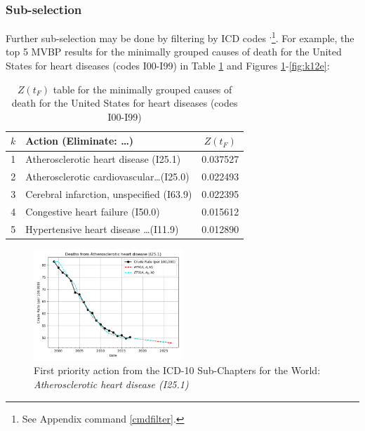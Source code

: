 \documentclass[10pt, a4paper, twocolumn]{IEEEconf}
\newcommand\footnotesstartsep{\textsuperscript{,}}
\begin{document}
\clearpage

\subsubsection{Sub-selection}

Further sub-selection may be done by filtering by ICD codes \citep{icd10vol1}\footnotesstartsep\footnote{See Appendix command \ref{cmdfilter}.}. For example, the top 5 MVBP results for the minimally grouped causes of death for the United States for heart diseases (codes I00-I99) in Table \ref{table:ztable12} and Figures \ref{fig:k12a}-\ref{fig:k12e}:

\begin{table}[H]
  \centering
  \begin{tabular}{clc}
    \toprule
      $k$ & Action (Eliminate: \ldots) & $Z(t_F)$ \\
    \midrule
      1 &        Atherosclerotic heart disease (I25.1) & 0.037527 \\
      2 & Atherosclerotic cardiovascular\ldots (I25.0) & 0.022493 \\
      3 &     Cerebral infarction, unspecified (I63.9) & 0.022395 \\
      4 &             Congestive heart failure (I50.0) & 0.015612 \\
      5 &    Hypertensive heart disease \ldots (I11.9) & 0.012890 \\
    \bottomrule
  \end{tabular}
  \caption{$Z(t_F)$ table for the minimally grouped causes of death for the United States for heart diseases (codes I00-I99)}
  \label{table:ztable12}
\end{table}

\begin{figure}[H]
  \centering
  \includegraphics[width=0.5\textwidth]{results/US_ICD10_MINIMALLY_GROUPED/Atherosclerotic_heart_disease_I25_1_ets.png}
  \caption{First priority action from the ICD-10 Sub-Chapters for the World: \textit{Atherosclerotic heart disease (I25.1)}}\label{fig:k12a}
\end{figure}
\end{document}
